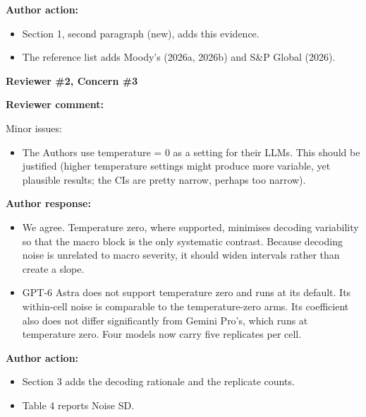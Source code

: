 \documentclass[11pt]{article}
\newcommand{\rvcomment}[1]{{\color{ReviewerGreen}#1}}
\newcommand{\concern}[1]{\textbf{\color{ReviewerGreen}#1}}
\begin{document}
\textbf{Author action:}

\begin{itemize}

\item Section 1, second paragraph (new), adds this evidence.

\item The reference list adds Moody's (2026a, 2026b) and S\&P Global (2026).

\end{itemize}

\vspace{12pt}
\concern{Reviewer \#2, Concern \#3}

\concern{Reviewer comment:}

\rvcomment{Minor issues:}

\begin{itemize}\color{ReviewerGreen}

\item \rvcomment{The Authors use temperature = 0 as a setting for their LLMs. This should be justified (higher temperature settings might produce more variable, yet plausible results; the CIs are pretty narrow, perhaps too narrow).}

\end{itemize}

\textbf{Author response:}

\begin{itemize}

\item We agree. Temperature zero, where supported, minimises decoding variability so that the macro block is the only systematic contrast. Because decoding noise is unrelated to macro severity, it should widen intervals rather than create a slope.

\item GPT-6 Astra does not support temperature zero and runs at its default. Its within-cell noise is comparable to the temperature-zero arms. Its coefficient also does not differ significantly from Gemini Pro's, which runs at temperature zero. Four models now carry five replicates per cell.

\end{itemize}

\textbf{Author action:}

\begin{itemize}

\item Section 3 adds the decoding rationale and the replicate counts.

\item Table 4 reports Noise SD.

\end{itemize}
\end{document}
